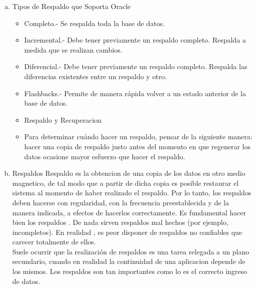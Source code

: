\documentclass[a4paper,twocolumn,10pt]{article}
\begin{document}
\begin{enumerate}[a)]
    \item Tipos de Respaldo que Soporta Oracle
   \begin{itemize}
          \item Completo.- Se respalda toda la base de datos.
          \item Incremental.- Debe tener previamente un respaldo completo. Respalda a medida que se realizan cambios.
          \item 	Diferencial.- Debe tener previamente un respaldo completo. Respalda las diferencias existentes entre un respaldo y otro.
          \item Flashbacks.- Permite de manera rápida volver a un estado anterior de la base de datos.
          \item Respaldo y Recuperacion
          \item Para determinar cu\'ando hacer un respaldo, pensar de la siguiente manera: hacer una copia de respaldo justo antes del momento en que regenerar los datos ocasione mayor esfuerzo que hacer el respaldo.
       \end{itemize}
   \item Respaldos
      \normalsize Respaldo es la obtencion de una copia de los datos en otro medio magnetico, de tal modo que a partir de dicha copia es posible restaurar el sistema al momento de haber realizado el respaldo. Por lo tanto, los respaldos deben hacerse con regularidad, con la frecuencia preestablecida y de la manera indicada, a efectos de hacerlos correctamente. Es fundamental hacer bien los respaldos . De nada sirven respaldos mal hechos (por ejemplo, incompletos). En realidad , es peor disponer de respaldos no confiables que carecer totalmente de ellos. \\
 Suele ocurrir que la realizaci\'on de respaldos es una tarea relegada a un plano secundario, cuando en realidad la continuidad de una aplicacion depende de los mismos. Los respaldos son tan importantes como lo es el correcto ingreso de datos.
\end{enumerate}
\end{document}

